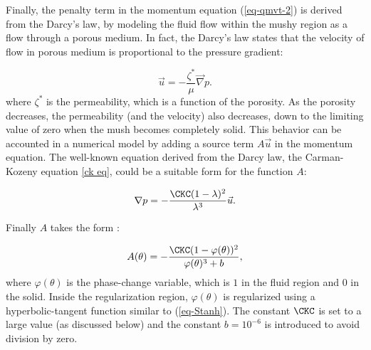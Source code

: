 Finally, the penalty term in the momentum equation (\ref{eq-qmvt-2}) is derived from the Darcy's law, by modeling the fluid flow within the mushy region as a flow through a porous medium.
In fact, the Darcy's law states that the velocity of flow in porous medium is proportional to the pressure gradient:

\begin{equation}
	\vec u = - \frac{\zeta^*}{\mu} \vec \nabla p.
\end{equation}
where $\zeta^*$ is the permeability, which is a function of the porosity.
As the porosity decreases, the permeability (and the velocity) also decreases, down to the limiting value of zero when the mush becomes completely solid.
This behavior can be accounted in a numerical model by adding a source term $A \vec u$ in the momentum equation.
The well-known equation derived from the Darcy law, the Carman-Kozeny equation \ref{ck eq}, could be a suitable form for the function $A$:

\begin{equation} \label{ck eq}
	\nabla p = - \frac{\CKC (1 - \lambda)^2}{\lambda^3} \vec u.
\end{equation}

Finally $A$ takes the form \citep{Belhamadia2012,kheirabadi2015effect}:

\begin{equation}\label{eq-CK}
A(\theta) = -\frac{\CKC (1 - \varphi(\theta))^2}{\varphi(\theta)^3 + b},
\end{equation}
where $\varphi(\theta)$ is the phase-change variable, which is  $1$ in the fluid region and $0$ in the solid. Inside the regularization region,  $\varphi(\theta)$ is regularized using a hyperbolic-tangent function similar to (\ref{eq-Stanh}).
The constant $\CKC$ is set to a  large value (as discussed below) and  the constant $b=10^{-6}$ is introduced to avoid division by zero.

